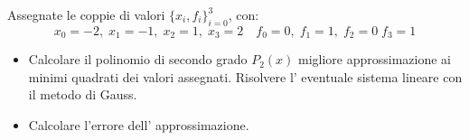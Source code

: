 Assegnate le coppie di valori $\{x_i,f_i \}_{i=0}^3$, con:
\[ x_0=-2, \; x_1=-1, \; x_2=1, \; x_3=2 \quad f_0=0, \; f_1=1, \; f_2=0 \; f_3=1 \]
\begin{itemize}
\item Calcolare il polinomio di secondo grado $P_2(x)$
migliore approssimazione ai minimi quadrati dei valori assegnati.
Risolvere l' eventuale sistema lineare con il metodo di Gauss.
\item Calcolare l'errore dell' approssimazione.
\end {itemize}

